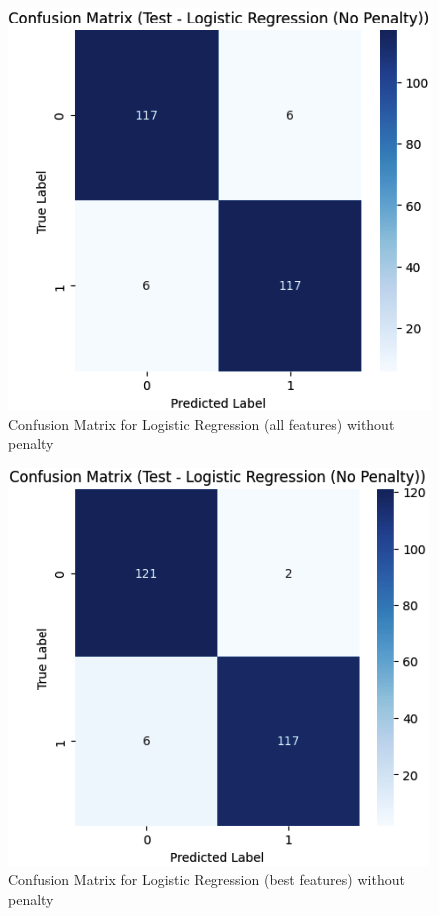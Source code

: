 \documentclass[conference]{IEEEtran}
\begin{document}
\begin{figure}[H]
    \centering
    \includegraphics[width=1\linewidth]{images/ConfusionMatrixNoPenaltyAllFeatures.png}
    \caption{Confusion Matrix for Logistic Regression (all features) without penalty}
    \label{fig:confusion-matrix-whole}
\end{figure}

\begin{figure}[H]
    \centering
    \includegraphics[width=1\linewidth]{images/ConfusionMatrixBestFeaturesLogisticNoPenalty.png}
    \caption{Confusion Matrix for Logistic Regression (best features) without penalty}
    \label{fig:confusion-matrix-best}
\end{figure}
\end{document}
